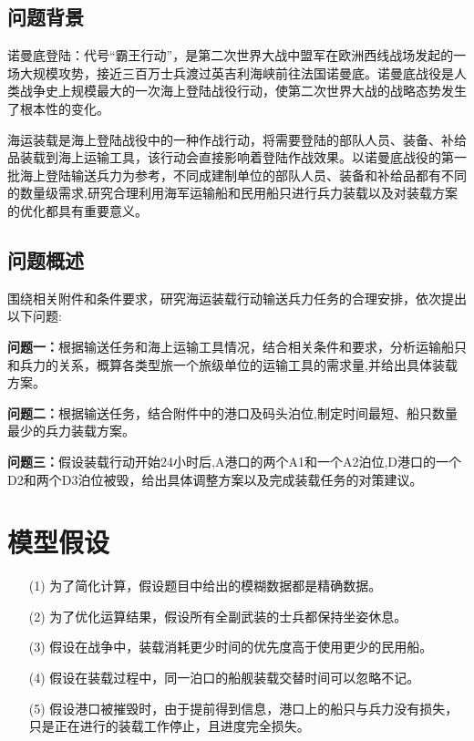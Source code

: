 \documentclass{whutmod}
\begin{document}
	\subsection{问题背景}
    诺曼底登陆：代号“霸王行动”，是第二次世界大战中盟军在欧洲西线战场发起的一场大规模攻势，接近三百万士兵渡过英吉利海峡前往法国诺曼底。诺曼底战役是人类战争史上规模最大的一次海上登陆战役行动，使第二次世界大战的战略态势发生了根本性的变化。
    
    海运装载是海上登陆战役中的一种作战行动，将需要登陆的部队人员、装备、补给品装载到海上运输工具，该行动会直接影响着登陆作战效果。以诺曼底战役的第一批海上登陆输送兵力为参考，不同成建制单位的部队人员、装备和补给品都有不同的数量级需求,研究合理利用海军运输船和民用船只进行兵力装载以及对装载方案的优化都具有重要意义。
    
    
    

	\subsection{问题概述}
    围绕相关附件和条件要求，研究海运装载行动输送兵力任务的合理安排，依次提出以下问题:
		 
	
	\textbf{问题一：}根据输送任务和海上运输工具情况，结合相关条件和要求，分析运输船只和兵力的关系，概算各类型旅一个旅级单位的运输工具的需求量,并给出具体装载方案。
	
	\textbf{问题二：}根据输送任务，结合附件中的港口及码头泊位,制定时间最短、船只数量最少的兵力装载方案。
	
	\textbf{问题三：}假设装载行动开始24小时后,A港口的两个A1和一个A2泊位,D港口的一个D2和两个D3泊位被毁，给出具体调整方案以及完成装载任务的对策建议。
	
	
	\section{模型假设}
	\begin{itemize}                                             
		\item [(1)] 为了简化计算，假设题目中给出的模糊数据都是精确数据。
		\item [(2)] 为了优化运算结果，假设所有全副武装的士兵都保持坐姿休息。
		\item [(3)] 假设在战争中，装载消耗更少时间的优先度高于使用更少的民用船。
		\item [(4)] 假设在装载过程中，同一泊口的船舰装载交替时间可以忽略不记。
		\item [(5)] 假设港口被摧毁时，由于提前得到信息，港口上的船只与兵力没有损失，只是正在进行的装载工作停止，且进度完全损失。
	\end{itemize}
	
\end{document}

